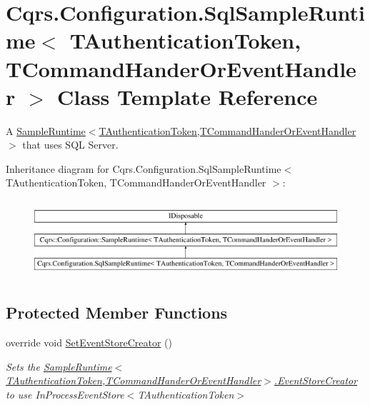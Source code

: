 \hypertarget{classCqrs_1_1Configuration_1_1SqlSampleRuntime}{}\section{Cqrs.\+Configuration.\+Sql\+Sample\+Runtime$<$ T\+Authentication\+Token, T\+Command\+Hander\+Or\+Event\+Handler $>$ Class Template Reference}
\label{classCqrs_1_1Configuration_1_1SqlSampleRuntime}


A \hyperlink{classCqrs_1_1Configuration_1_1SampleRuntime_a9382e8b20b8701815ad20c1cd645c27b_a9382e8b20b8701815ad20c1cd645c27b}{Sample\+Runtime$<$\+T\+Authentication\+Token,\+T\+Command\+Hander\+Or\+Event\+Handler$>$} that uses S\+QL Server.  


Inheritance diagram for Cqrs.\+Configuration.\+Sql\+Sample\+Runtime$<$ T\+Authentication\+Token, T\+Command\+Hander\+Or\+Event\+Handler $>$\+:\begin{figure}[H]
\begin{center}
\leavevmode
\includegraphics[height=2.886598cm]{classCqrs_1_1Configuration_1_1SqlSampleRuntime}
\end{center}
\end{figure}
\subsection*{Protected Member Functions}
\begin{DoxyCompactItemize}
\item 
override void \hyperlink{classCqrs_1_1Configuration_1_1SqlSampleRuntime_ae2fedd0697e72a1283a098c809d832c9_ae2fedd0697e72a1283a098c809d832c9}{Set\+Event\+Store\+Creator} ()
\begin{DoxyCompactList}\small\item\em Sets the \hyperlink{classCqrs_1_1Configuration_1_1SampleRuntime_a9038dd478bcafb2f5f65cbcbada712db_a9038dd478bcafb2f5f65cbcbada712db}{Sample\+Runtime$<$\+T\+Authentication\+Token,\+T\+Command\+Hander\+Or\+Event\+Handler$>$.\+Event\+Store\+Creator} to use In\+Process\+Event\+Store$<$\+T\+Authentication\+Token$>$ \end{DoxyCompactList}\end{DoxyCompactItemize}
